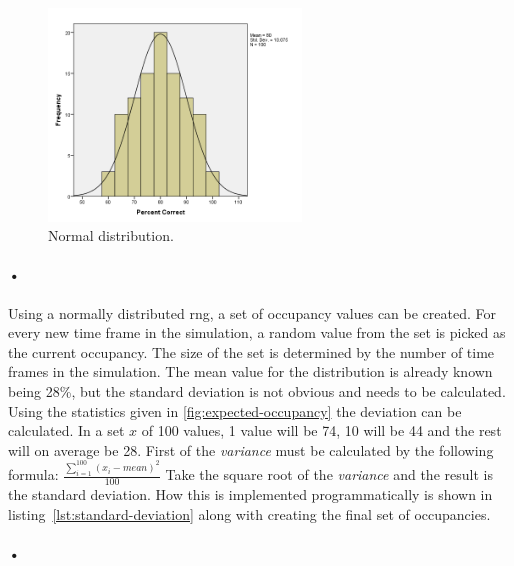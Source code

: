 \documentclass[a4paper, 12pt]{report}
\begin{document}
\begin{figure}[h!]
	\centering
		\includegraphics[width=0.6\textwidth]{images/normal-dist.png}
		\caption[Normal distribution.]{Normal distribution. \cite{normal-dist-image}}
		\label{fig:normal-dist}
\end{figure}

\paragraph{•}
Using a normally distributed \gls{rng}, a set of occupancy values can be created.
For every new time frame in the simulation, a random value from the set is picked as the current occupancy.
The size of the set is determined by the number of time frames in the simulation.
The mean value for the distribution is already known being 28\%, but the standard deviation is not obvious and needs to be calculated.
Using the statistics given in \ref{fig:expected-occupancy} the deviation can be calculated.
In a set $x$ of 100 values, 1 value will be 74, 10 will be 44 and the rest will on average be 28.
First of the \textit{variance} must be calculated by the following formula:
$ \frac{\sum_{i=1}^{100} (x_i - mean)^2}{100}$
Take the square root of the \textit{variance} and the result is the standard deviation.
How this is implemented programmatically is shown in listing~\ref{lst:standard-deviation} along with creating the final set of occupancies.

\paragraph{•}
\begin{minipage}{\linewidth}

\end{minipage}
\end{document}
